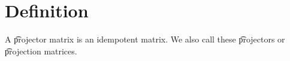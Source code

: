 
\section*{Definition}

A \t{projector matrix} is an idempotent matrix.
We also call these \t{projectors} or \t{projection matrices}.

